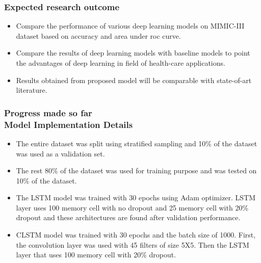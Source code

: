 \documentclass{beamer}
\begin{document}
\begin{frame}\frametitle{Expected research outcome}
\begin{itemize}
\item Compare the performance of various deep learning models on MIMIC-III dataset based on accuracy and area under roc curve.
\item Compare the results of deep learning models with baseline models to point the advantages of deep learning in field of health-care applications.
\item Results obtained from proposed model will be comparable with state-of-art literature.
\end{itemize}
\end{frame}

\begin{frame}\frametitle{Progress made so far\\\footnotesize{Model Implementation Details}}
\begin{itemize}
    \item The entire dataset was split using stratified sampling and 10\% of the dataset was used as a validation set.
    \item The rest 80\% of the dataset was used for training purpose and was tested on 10\% of the dataset.
    \item The LSTM model was trained with 30 epochs using Adam optimizer. LSTM layer uses 100 memory cell with no dropout and 25 memory cell with 20\% dropout and these architectures are found after validation performance.
    \item CLSTM model was trained with 30 epochs and the batch size of 1000. First, the convolution layer was used with 45 filters of size 5X5. Then the LSTM layer that uses 100 memory cell with 20\% dropout.
\end{itemize}
\end{frame}
\end{document}
